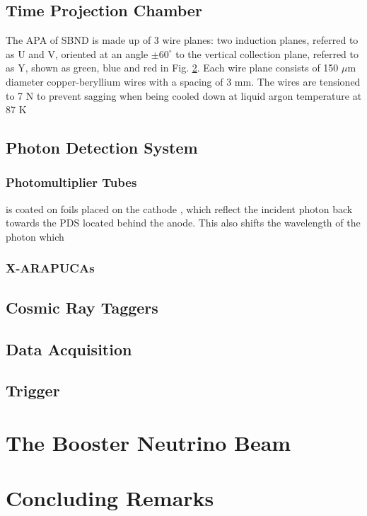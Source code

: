 \subsection{Time Projection Chamber}


The APA of SBND is made up of 3 wire planes: two induction planes, referred to as U and V, oriented at an angle $\pm 60^{\circ}$ to the vertical collection plane, referred to as Y, shown as green, blue and red in Fig. \ref{}.
Each wire plane consists of 150 $\mu$m diameter copper-beryllium wires with a spacing of 3 mm.
The wires are tensioned to 7 N to prevent sagging when being cooled down at liquid argon temperature at 87 K\cite{}




\subsection{Photon Detection System}

\subsubsection{Photomultiplier Tubes}
is coated on foils placed on the cathode
, which reflect the incident photon back towards the PDS located behind the anode. 
This also shifts the wavelength of the photon which 


\subsubsection{X-ARAPUCAs}

\subsection{Cosmic Ray Taggers}

\subsection{Data Acquisition}

\subsection{Trigger}

\section{The Booster Neutrino Beam}

\section{Concluding Remarks}
